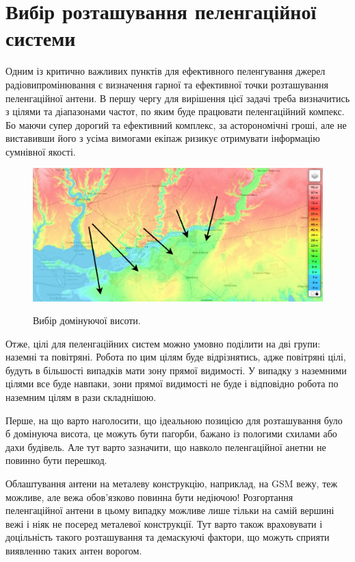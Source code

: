 \documentclass{article}
\begin{document}
\section{Вибір розташування пеленгаційної системи}
\label{sec:DF Placement}

Одним із критично важливих пунктів для ефективного пеленгування джерел радіовипромінювання є визначення гарної та ефективної точки розташування пеленгаційної антени. В першу чергу для вирішення цієї задачі треба визначитись з цілями та діапазонами частот, по яким буде працювати пеленгаційний компекс. Бо маючи  супер дорогий та ефективний комплекс, за асторономічні гроші, але не виставивши його з усіма вимогами екіпаж ризикує отримувати інформацію сумнівної якості.

\begin{figure}[H]
	\centering
	{\includegraphics[width=0.8\linewidth]{images/dominant_height.png}}
	\caption{\label{fig:triangulations} Вибір домінуючої висоти.}
\end{figure}

Отже, цілі для пеленгаційних систем можно умовно поділити на дві групи: наземні та повітряні. Робота по цим цілям буде відрізнятись, адже повітряні цілі, будуть в більшості випадків мати зону прямої видимості. У випадку з наземними цілями все буде навпаки, зони прямої видимості не буде і відповідно робота по наземним цілям в рази складнішою.

Перше, на що варто наголосити, що ідеальною позицією для розташування було б домінуюча висота, це можуть бути пагорби, бажано із пологими схилами або дахи будівель. Але тут варто зазначити, що навколо пеленгаційної анетни не повинно бути перешкод. 

Облаштування антени на металеву конструкцію, наприклад, на GSM вежу, теж можливе, але вежа обов'язково повинна бути недіючою! Розгортання пеленгаційної антени в цьому випадку можливе лише тільки на самій вершині вежі і ніяк не посеред металевої конструкції. Тут варто також враховувати і доцільність такого розташування та демаскуючі фактори, що можуть сприяти виявленню таких антен ворогом.
\end{document}
